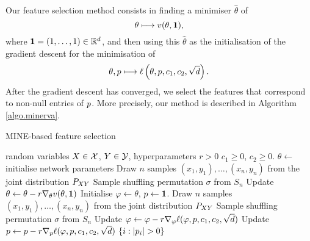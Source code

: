 Our feature selection method
consists in
finding a minimiser 
$\hat{\theta}$ of 
\begin{equation*}
\theta \longmapsto {v}(\theta, \mathbf{1}),
\end{equation*}
where $\mathbf{1} = (1, \dots, 1) \in \mathbb{R}^{d}$,
and then using this $\hat{\theta}$
as the initialisation of the gradient descent 
for the minimisation of 
\begin{equation*}
	\theta, {p} \longmapsto {\ell}\left(\theta, {p}, c_1, c_2, \sqrt{d}\right).
\end{equation*}
After the gradient descent has converged,
we select the features that correspond to non-null entries of ${p}$.
More precisely, our method is described in Algorithm \ref{algo.minerva}.

\begin{algorithm}
	\caption{MINE-based feature selection}
	\label{algo.minerva}
	\begin{algorithmic}[1]
		\REQUIRE
		random variables
		$X\in \mathcal{X}$,
		$Y\in \mathcal{Y}$,
		hyperparameters
		$r>0$
		$c_1\geq 0$, $c_2\geq 0$.
		\STATE $\theta \leftarrow$ initialise network parameters
		\REPEAT
		\STATE Draw $n$ samples $(x_1, y_1), \dots, (x_n, y_n)$ from the joint distribution ${{P}}_{XY}$
		\STATE Sample shuffling permutation $\sigma$ from $S_n$
		\STATE Update $\theta \leftarrow \theta - r\nabla_{\theta}{v}(\theta, \mathbf{1})$%
		\STATE Initialise $\varphi \leftarrow \theta$, ${p} \leftarrow \mathbf{1}$.
		\REPEAT
		\STATE Draw $n$ samples $(x_1, y_1), \dots, (x_n, y_n)$ from the joint distribution ${{P}}_{XY}$
		\STATE Sample shuffling permutation $\sigma$ from $S_n$
		\STATE Update $\varphi \leftarrow \varphi - r \nabla_{\varphi}{\ell}(\varphi, {p}, c_1, c_2, \sqrt{d})$
		\STATE Update ${p} \leftarrow {p} - r \nabla_{{p}}{\ell}(\varphi, {p}, c_1, c_2, \sqrt{d})$
		\RETURN $\left\lbrace i: \left\lvert {{p}_i} \right\rvert > 0\right\rbrace$

	\end{algorithmic}

\end{algorithm}





